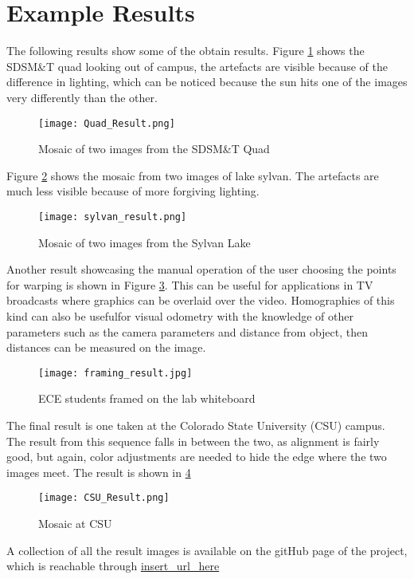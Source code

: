 \documentclass[10pt,twocolumn,letterpaper]{article}
\begin{document}
\section{Example Results}
The following results show some of the obtain results. Figure \ref{fig:quad} shows the SDSM\&T quad looking out of campus, the artefacts are visible because of the difference in lighting, which can be noticed because the sun hits one of the images very differently than the other.
\begin{center}
\begin{figure}[!!!!h]
\texttt{[image: Quad\_Result.png]}
\caption{Mosaic of two images from the SDSM\&T Quad}
\label{fig:quad}
\end{figure}
\end{center}
Figure \ref{fig:lake} shows the mosaic from two images of lake sylvan. The artefacts are much less visible because of more forgiving lighting.
\begin{figure}[h!]
\texttt{[image: sylvan\_result.png]}
\caption{Mosaic of two images from the Sylvan Lake}
\label{fig:lake}
\end{figure}
\newpage
Another result showcasing the manual operation of the user choosing the points for warping is shown in Figure \ref{fig:conrad}. This can be useful for applications in TV broadcasts where graphics can be overlaid over the video. Homographies of this kind can also be usefulfor visual odometry with the knowledge of other parameters such as the camera parameters and distance from object, then distances can be measured on the image.
\begin{center}
\begin{figure}[!!!!h]
\texttt{[image: framing\_result.jpg]}
\caption{ECE students framed on the lab whiteboard}
\label{fig:conrad}
\end{figure}
\end{center}
The final result is one taken at the Colorado State University (CSU) campus. The result from this sequence falls in between the two, as alignment is fairly good, but again, color adjustments are needed to hide the edge where the two images meet. The result is shown in \ref{fig:CSU}
\begin{center}
\begin{figure}[!!!!h]
\texttt{[image: CSU\_Result.png]}
\caption{Mosaic at CSU}
\label{fig:CSU}
\end{figure}
\end{center}
A collection of all the result images is available on the gitHub page of the project, which is reachable through \url{insert_url_here}
\end{document}
